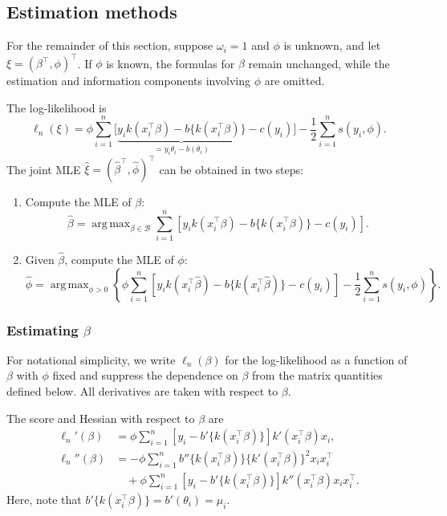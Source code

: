 \documentclass{article}
\theoremstyle{break}
\DeclareMathOperator*{\argmax}{arg\,max}
\begin{document}
\subsection{Estimation methods}\label{sec:glm-estimation}
For the remainder of this section, suppose $\omega_i=1$ and $\phi$ is unknown, and let $\xi=(\beta^\top,\phi)^\top$. If $\phi$ is known, the formulas for $\beta$ remain unchanged, while the estimation and information components involving $\phi$ are omitted. 

The log-likelihood is
\[
  \ell_n(\xi)
  =\phi\sum_{i=1}^n
  \Big[
    \underbrace{y_i k(x_i^\top\beta)
    -b\{k(x_i^\top\beta)\}}_{= y_i \theta_i - b(\theta_i)}
    -c(y_i)
  \Big]
  -\frac{1}{2}\sum_{i=1}^n s(y_i,\phi).
\]
The joint MLE $\hat\xi=(\hat\beta^\top,\hat\phi)^\top$ can be obtained in two steps:
\begin{enumerate}
  \item Compute the MLE of $\beta$:
  \[
    \hat\beta
    =\argmax_{\beta\in\mathcal{B}}
    \sum_{i=1}^n
    \left[
      y_i k(x_i^\top\beta)
      -b\{k(x_i^\top\beta)\}
      -c(y_i)
    \right].
  \]
  \item Given $\hat\beta$, compute the MLE of $\phi$:
  \[
    \hat\phi
    =\argmax_{\phi>0}
    \left\{
      \phi\sum_{i=1}^n
      \left[
        y_i k(x_i^\top\hat\beta)
        -b\{k(x_i^\top\hat\beta)\}
        -c(y_i)
      \right]
      -\frac{1}{2}\sum_{i=1}^n s(y_i,\phi)
    \right\}.
  \]
\end{enumerate}

\subsubsection{Estimating $\beta$}
For notational simplicity, we write $\ell_n(\beta)$ for the log-likelihood as a function of $\beta$ with $\phi$ fixed and suppress the dependence on $\beta$ from the matrix quantities defined below. All derivatives are taken with respect to $\beta$.

The score and Hessian with respect to $\beta$ are
\begin{align*}
  \ell_n'(\beta)
  &=\phi\sum_{i=1}^n
  \left[y_i-b'\{k(x_i^\top\beta)\}\right]
  k'(x_i^\top\beta)x_i, \\
  \ell_n''(\beta)
  &=-\phi\sum_{i=1}^n
  b''\{k(x_i^\top\beta)\}
  \{k'(x_i^\top\beta)\}^2x_ix_i^\top \\
  &\quad+\phi\sum_{i=1}^n
  \left[y_i-b'\{k(x_i^\top\beta)\}\right]
  k''(x_i^\top\beta)x_ix_i^\top.
\end{align*}
Here, note that $b'\{k(x_i^\top\beta)\} = b'(\theta_i) = \mu_i$.
\end{document}
